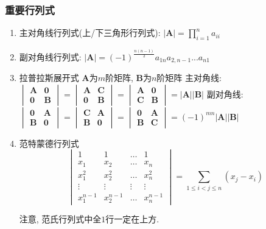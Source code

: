 \subsubsection{重要行列式}
\begin{enumerate}
\item 主对角线行列式(上/下三角形行列式): $ |\bm{A}|=\prod_{i=1}^{n}a_{ii} $
\item 副对角线行列式: $ |\bm{A}|=(-1)^{\frac{n(n-1)}{2}}a_{1n}a_{2,n-1}...a_{n1} $
\item 拉普拉斯展开式
\subitem $ \bm{A} $为$ m $阶矩阵, $ \bm{B} $为$ n $阶矩阵
\subitem 主对角线:
$ \begin{vmatrix}
\bm{A} & \bm{0} \\
\bm{0} & \bm{B}
\end{vmatrix} = \begin{vmatrix}
\bm{A} & \bm{C} \\
\bm{0} & \bm{B}
\end{vmatrix} = \begin{vmatrix}
\bm{A} & \bm{0} \\
\bm{C} & \bm{B}
\end{vmatrix} = |\bm{A}||\bm{B}|$
\subitem 副对角线: 
$ \begin{vmatrix}
\bm{0} & \bm{A} \\
\bm{B} & \bm{0}
\end{vmatrix} = \begin{vmatrix}
\bm{C} & \bm{A} \\
\bm{B} & \bm{0}
\end{vmatrix} = \begin{vmatrix}
\bm{0} & \bm{A} \\
\bm{B} & \bm{C}
\end{vmatrix} = (-1)^{mn}|\bm{A}||\bm{B}|$
\item 范特蒙德行列式
\begin{equation*}
\begin{vmatrix}
1 & 1 & \dots & 1 \\
x_1 & x_2 & \dots & x_n \\
x_1^2 & x_2^2 & \dots & x_n^2 \\
\vdots & \vdots  & \vdots & \vdots \\
x_{1}^{n-1} & x_{2}^{n-1} & \dots & x_{n}^{n-1} 
\end{vmatrix} = \sum_{1\le i<j\le n}(x_{j}-x_{i})
\end{equation*}\par
 注意, 范氏行列式中全$1$行一定在上方.
\end{enumerate}
